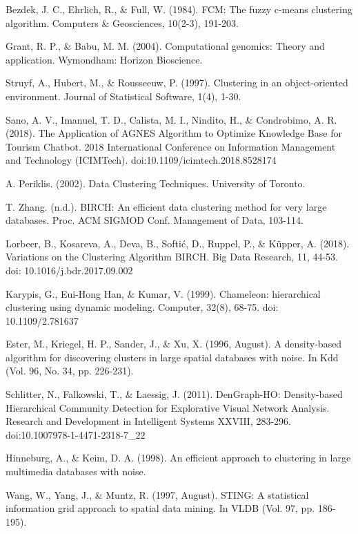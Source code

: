 \documentclass[10pt, a4paper]{article}
\begin{document}
\begin{thebibliography}{X}
 Bezdek, J. C., Ehrlich, R., \& Full, W. (1984). FCM: The fuzzy c-means clustering algorithm. Computers \& Geosciences, 10(2-3), 191-203.

 Grant, R. P., \& Babu, M. M. (2004). Computational genomics: Theory and application. Wymondham: Horizon Bioscience.

 Struyf, A., Hubert, M., \& Rousseeuw, P. (1997). Clustering in an object-oriented environment. Journal of Statistical Software, 1(4), 1-30.

 Sano, A. V., Imanuel, T. D., Calista, M. I., Nindito, H., \& Condrobimo, A. R. (2018). The Application of AGNES Algorithm to Optimize Knowledge Base for Tourism Chatbot. 2018 International Conference on Information Management and Technology (ICIMTech). doi:10.1109/icimtech.2018.8528174

 A. Periklis. (2002). Data Clustering Techniques. University of Toronto.

 T. Zhang. (n.d.). BIRCH: An efficient data clustering method for very large databases. Proc. ACM SIGMOD Conf. Management of Data, 103-114.

 Lorbeer, B., Kosareva, A., Deva, B., Softić, D., Ruppel, P., \& Küpper, A. (2018). Variations on the Clustering Algorithm BIRCH. Big Data Research, 11, 44-53. doi: 10.1016/j.bdr.2017.09.002

 Karypis, G., Eui-Hong Han, \& Kumar, V. (1999). Chameleon: hierarchical clustering using dynamic modeling. Computer, 32(8), 68-75. doi: 10.1109/2.781637

 Ester, M., Kriegel, H. P., Sander, J., \& Xu, X. (1996, August). A density-based algorithm for discovering clusters in large spatial databases with noise. In Kdd (Vol. 96, No. 34, pp. 226-231).

 Schlitter, N., Falkowski, T., \& Laessig, J. (2011). DenGraph-HO: Density-based Hierarchical Community Detection for Explorative Visual Network Analysis. Research and Development in Intelligent Systems XXVIII, 283-296. doi:10.1007\/978-1-4471-2318-7\_22

 Hinneburg, A., \& Keim, D. A. (1998). An efficient approach to clustering in large multimedia databases with noise.

 Wang, W., Yang, J., \& Muntz, R. (1997, August). STING: A statistical information grid approach to spatial data mining. In VLDB (Vol. 97, pp. 186-195).


\end{thebibliography}
\end{document}
